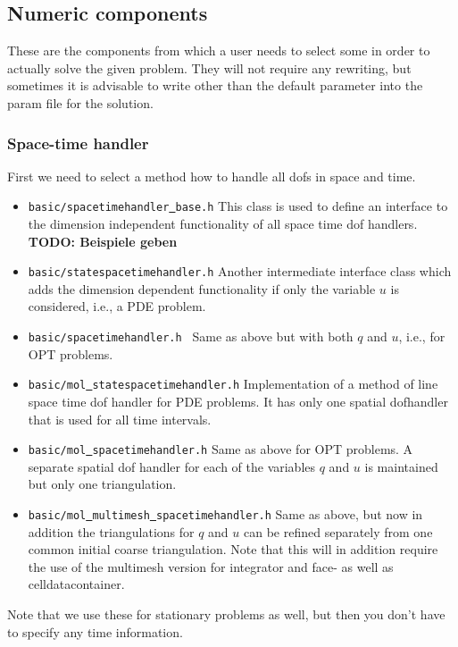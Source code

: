 \documentclass[prodmode,acmtoms]{acmsmall}
\numberwithin{equation}{section}
\begin{document}
\subsection{Numeric components}
These are the components from which a user needs to select some in order to actually 
solve the given problem. They will not require any rewriting, but sometimes it is 
advisable to write other than the default parameter into the param file for the 
solution.

\subsubsection{Space-time handler}
First we need to select a method how to handle all dofs in space and time.
\begin{itemize}
\item \texttt{basic/spacetimehandler\underline{ }base.h} This class is used to define 
  an interface to the dimension independent functionality of all space time dof handlers.
  {\bf TODO: Beispiele geben}
\item \texttt{basic/statespacetimehandler.h} Another intermediate interface class which adds 
  the dimension dependent functionality if only the variable $u$ is considered, i.e., a 
  PDE problem.
\item \texttt{basic/spacetimehandler.h } Same as above but with both $q$ and $u$, i.e., for
  OPT problems.
\item \texttt{basic/mol\underline{ }statespacetimehandler.h} Implementation of a method of 
  line space time dof handler for PDE problems. It has only one spatial 
  dofhandler that is used for all time intervals.
\item \texttt{basic/mol\underline{ }spacetimehandler.h} Same as above for OPT problems.
  A separate spatial dof handler for each of the variables $q$ and $u$ is maintained 
  but only one triangulation.
\item \texttt{basic/mol\underline{ }multimesh\underline{ }spacetimehandler.h}
  Same as above, but now in addition the triangulations for $q$ and $u$ can be refined
  separately from one common initial coarse triangulation. Note that this will
  in addition require the use of the multimesh version for integrator and 
  face- as well as celldatacontainer.
\end{itemize}
Note that we use these for stationary problems as well, but then you don't have to specify
any time information.
\end{document}
